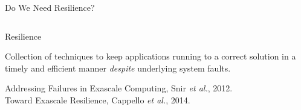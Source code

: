 


\begin{frame}{Do We Need Resilience?}
\initclock

\begin{columns}
\begin{column}{1.05\textwidth}

\vspace{-4.195cm}
\begin{block}{Resilience}
\begin{center}
Collection of techniques to keep applications 
running to a correct solution in a timely and 
efficient manner {\it despite} underlying system faults.
\end{center}
\end{block}
{ \footnotesize Addressing Failures in Exascale Computing, 
Snir {\it et al.}, 2012.\\
Toward Exascale Resilience, Cappello {\it et al.}, 2014.}
\end{column}
\end{columns}
%
\vspace{-0.35cm}
%
\begin{columns}
\hspace{-1cm}
\begin{column}{0.65\textwidth}
\end{column}
\begin{column}{0.4\textwidth}
\end{column}
\end{columns}
%
\end{frame}






